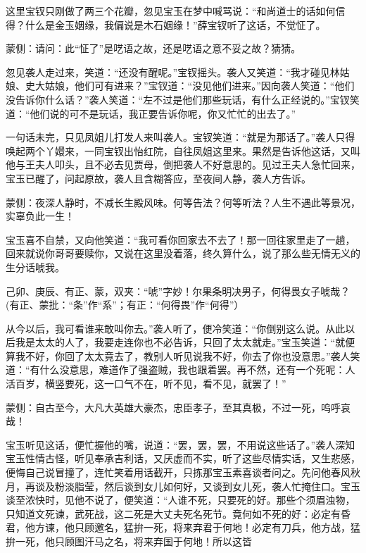 \begin{parag}
    这里宝钗只刚做了两三个花瓣，忽见宝玉在梦中喊骂说：“和尚道士的话如何信得？什么是金玉姻缘，我偏说是木石姻缘！”薛宝钗听了这话，不觉怔了。\begin{note}蒙侧：请问：此“怔了”是呓语之故，还是呓语之意不妥之故？猜猜。\end{note}忽见袭人走过来，笑道：“还没有醒呢。”宝钗摇头。袭人又笑道：“我才碰见林姑娘、史大姑娘，他们可有进来？”宝钗道：“没见他们进来。”因向袭人笑道：“他们没告诉你什么话？”袭人笑道：“左不过是他们那些玩话，有什么正经说的。”宝钗笑道：“他们说的可不是玩话，我正要告诉你呢，你又忙忙的出去了。”
\end{parag}


\begin{parag}
    一句话未完，只见凤姐儿打发人来叫袭人。宝钗笑道：“就是为那话了。”袭人只得唤起两个丫嬛来，一同宝钗出怡红院，自往凤姐这里来。果然是告诉他这话，又叫他与王夫人叩头，且不必去见贾母，倒把袭人不好意思的。见过王夫人急忙回来，宝玉已醒了，问起原故，袭人且含糊答应，至夜间人静，袭人方告诉。\begin{note}蒙侧：夜深人静时，不减长生殿风味。何等告法？何等听法？人生不遇此等景况，实辜负此一生！\end{note}宝玉喜不自禁，又向他笑道：“我可看你回家去不去了！那一回往家里走了一趟，回来就说你哥哥要赎你，又说在这里没着落，终久算什么，说了那么些无情无义的生分话唬我。\begin{note}己卯、庚辰、有正、蒙，双夹：“唬”字妙！尔果条明决男子，何得畏女子唬哉？(有正、蒙批：“条”作“系”；有正：“何得畏”作“何得”）\end{note}从今以后，我可看谁来敢叫你去。”袭人听了，便冷笑道：“你倒别这么说。从此以后我是太太的人了，我要走连你也不必告诉，只回了太太就走。”宝玉笑道：“就便算我不好，你回了太太竟去了，教别人听见说我不好，你去了你也没意思。”袭人笑道：“有什么没意思，难道作了强盗贼，我也跟着罢。再不然，还有一个死呢：人活百岁，横竖要死，这一口气不在，听不见，看不见，就罢了！”\begin{note}蒙侧：自古至今，大凡大英雄大豪杰，忠臣孝子，至其真极，不过一死，呜呼哀哉！\end{note}宝玉听见这话，便忙握他的嘴，说道：“罢，罢，罢，不用说这些话了。”袭人深知宝玉性情古怪，听见奉承吉利话，又厌虚而不实，听了这些尽情实话，又生悲感，便悔自己说冒撞了，连忙笑着用话截开，只拣那宝玉素喜谈者问之。先问他春风秋月，再谈及粉淡脂莹，然后谈到女儿如何好，又谈到女儿死，袭人忙掩住口。宝玉谈至浓快时，见他不说了，便笑道：“人谁不死，只要死的好。那些个须眉浊物，只知道文死谏，武死战，这二死是大丈夫死名死节。竟何如不死的好：必定有昏君，他方谏，他只顾邀名，猛拚一死，将来弃君于何地！必定有刀兵，他方战，猛拚一死，他只顾图汗马之名，将来弃国于何地！所以这皆
\end{parag}
